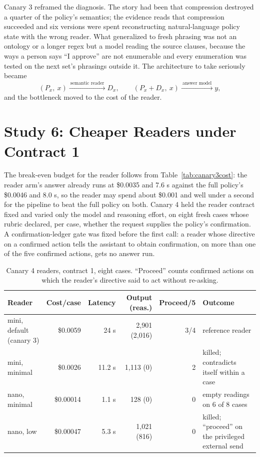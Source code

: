 \documentclass[11pt]{article}
\newcommand{\px}{P_x}
\newcommand{\dx}{D_x}
\begin{document}
Canary 3 reframed the diagnosis. The story had been that compression destroyed a quarter of the policy's semantics; the evidence reads that compression succeeded and six versions were spent reconstructing natural-language policy state with the wrong reader. What generalized to fresh phrasing was not an ontology or a longer regex but a model reading the source clauses, because the ways a person says ``I approve'' are not enumerable and every enumeration was tested on the next set's phrasings outside it. The architecture to take seriously became
\begin{equation}
  (\px,\ x) \xrightarrow{\ \text{semantic reader}\ } \dx, \qquad (\px + \dx,\ x) \xrightarrow{\ \text{answer model}\ } y,
\end{equation}
and the bottleneck moved to the cost of the reader.

\section{Study 6: Cheaper Readers under Contract 1}
\label{sec:canary4}

The break-even budget for the reader follows from Table~\ref{tab:canary3cost}: the reader arm's answer already runs at \$0.0035 and 7.6 s against the full policy's \$0.0046 and 8.0 s, so the reader may spend about \$0.001 and well under a second for the pipeline to beat the full policy on both. Canary 4 held the reader contract fixed and varied only the model and reasoning effort, on eight fresh cases whose rubric declared, per case, whether the request supplies the policy's confirmation. A confirmation-ledger gate was fixed before the first call: a reader whose directive on a confirmed action tells the assistant to obtain confirmation, on more than one of the five confirmed actions, gets no answer run.

\begin{table}[t]
\centering
\caption{Canary 4 readers, contract 1, eight cases. ``Proceed'' counts confirmed actions on which the reader's directive said to act without re-asking.}
\label{tab:canary4}
\small
\begin{tabularx}{\textwidth}{@{}l@{\hspace{6pt}}r@{\hspace{6pt}}r@{\hspace{6pt}}r@{\hspace{6pt}}r@{\hspace{8pt}}L@{}}
\toprule
Reader & Cost/case & Latency & Output (reas.) & Proceed/5 & Outcome \\
\midrule
mini, default (canary 3) & \$0.0059 & 24 s & 2,901 (2,016) & 3/4 & reference reader \\
mini, minimal & \$0.0026 & 11.2 s & 1,113 (0) & 2 & killed; contradicts itself within a case \\
nano, minimal & \$0.00014 & 1.1 s & 128 (0) & 0 & empty readings on 6 of 8 cases \\
nano, low & \$0.00047 & 5.3 s & 1,021 (816) & 0 & killed; ``proceed'' on the privileged external send \\
\bottomrule
\end{tabularx}
\end{table}
\end{document}

